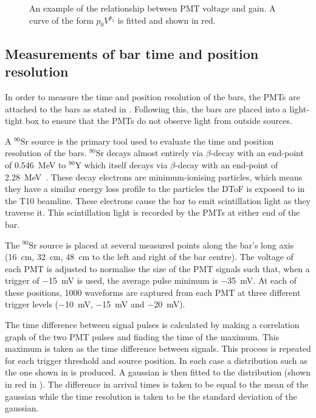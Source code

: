 \begin{figure}[h]
  \centering
  \begin{adjustbox}{max totalsize={.8\textwidth}, center}
    
  \end{adjustbox}
  \caption[Example of relationship between PMT voltage and gain]{An example of the relationship between PMT voltage and gain. A curve of the form $p_{0} V^{p_{1}}$ is fitted and shown in red.}
  \label{fig:gainEx}
\end{figure}

\subsection{Measurements of bar time and position resolution}
\label{sec:hptpc_dtof_characterisation:characterisation:barRes}

In order to measure the time and position resolution of the bars, the PMTs are attached to the bars as stated in .
Following this, the bars are placed into a light-tight box to ensure that the PMTs do not observe light from outside sources.

A $^{90}\text{Sr}$ source is the primary tool used to evaluate the time and position resolution of the bars.
$^{90}\text{Sr}$ decays almost entirely via $\beta$-decay with an end-point of \SI{0.546}{\mega\electronvolt} to $^{90}\text{Y}$ which itself decays via $\beta$-decay with an end-point of \SI{2.28}{\mega\electronvolt}~\cite{strontium}.
These decay electrons are minimum-ionising particles, which means they have a similar energy loss profile to the particles the DToF is exposed to in the T10 beamline.
These electrons cause the bar to emit scintillation light as they traverse it.
This scintillation light is recorded by the PMTs at either end of the bar.

The $^{90}\text{Sr}$ source is placed at several measured points along the bar's long axis (\SI{16}{\cm}, \SI{32}{\cm}, \SI{48}{\cm} to the left and right of the bar centre).
The voltage of each PMT is adjusted to normalise the size of the PMT signals such that, when a trigger of \SI{-15}{\milli\volt} is used, the average pulse minimum is \SI{-35}{\milli\volt}.
At each of these positions, 1000 waveforms are captured from each PMT at three different trigger levels (\SI{-10}{\milli\volt}, \SI{-15}{\milli\volt} and \SI{-20}{\milli\volt}).

The time difference between signal pulses is calculated by making a correlation graph of the two PMT pulses and finding the time of the maximum.
This maximum is taken as the time difference between signals.
This process is repeated for each trigger threshold and source position.
In each case a distribution such as the one shown in  is produced.
A gaussian is then fitted to the distribution (shown in red in ).
The difference in arrival times is taken to be equal to the mean of the gaussian while the time resolution is taken to be the standard deviation of the gaussian.

